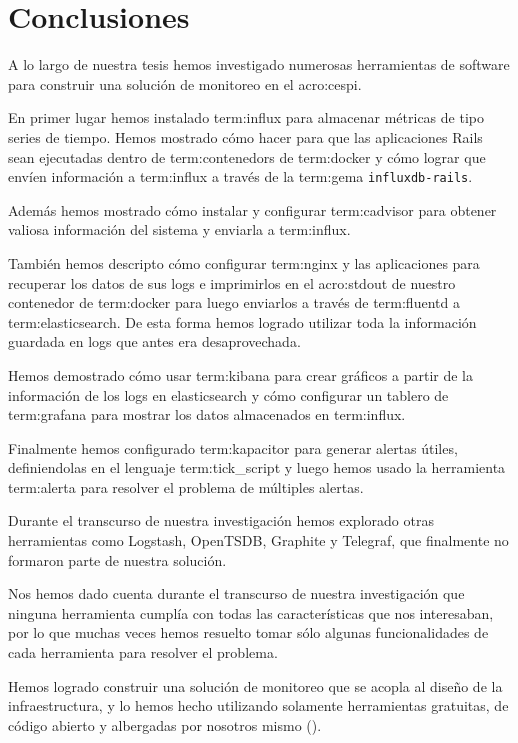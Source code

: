 \newpage
\section{Conclusiones}
\label{conclusiones}

A lo largo de nuestra tesis hemos investigado numerosas herramientas de
software para construir una solución de monitoreo en el \gls{acro:cespi}.

En primer lugar hemos instalado \gls{term:influx} para almacenar métricas de
tipo series de tiempo. Hemos mostrado cómo hacer para que las aplicaciones
Rails sean ejecutadas dentro de \glspl{term:contenedor} de \gls{term:docker} y cómo lograr
que envíen información a \gls{term:influx} a través de la \gls{term:gema}
\texttt{influxdb-rails}.

Además hemos mostrado cómo instalar y configurar \gls{term:cadvisor} para
obtener valiosa información del sistema y enviarla a \gls{term:influx}.

También hemos descripto cómo configurar \gls{term:nginx} y las aplicaciones
para recuperar los datos de sus logs e imprimirlos en el \gls{acro:stdout} de
nuestro contenedor de \gls{term:docker} para luego enviarlos a través de
\gls{term:fluentd} a \gls{term:elasticsearch}. De esta forma hemos logrado
utilizar toda la información guardada en logs que antes era desaprovechada.

Hemos demostrado cómo usar \gls{term:kibana} para crear gráficos a partir de la
información de los logs en elasticsearch y cómo configurar un tablero de
\gls{term:grafana} para mostrar los datos almacenados en \gls{term:influx}.

Finalmente hemos configurado \gls{term:kapacitor} para generar alertas útiles,
definiendolas en el lenguaje \gls{term:tick_script} y luego hemos usado la
herramienta \gls{term:alerta} para resolver el problema de múltiples alertas.

Durante el transcurso de nuestra investigación hemos explorado otras
herramientas como Logstash, OpenTSDB, Graphite y Telegraf, que finalmente no
formaron parte de nuestra solución.

Nos hemos dado cuenta durante el transcurso de nuestra investigación que
ninguna herramienta cumplía con todas las características que nos interesaban,
por lo que muchas veces hemos resuelto tomar sólo algunas funcionalidades de
cada herramienta para resolver el problema.

Hemos logrado construir una solución de monitoreo que se acopla al diseño de la
infraestructura, y lo hemos hecho utilizando solamente herramientas gratuitas,
de código abierto y albergadas por nosotros mismo ().


